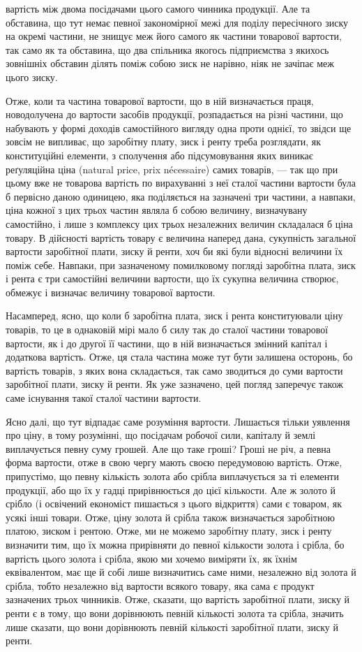 вартість між двома посідачами цього самого чинника продукції. Але та обставина,
що тут немає певної закономірної межі для поділу пересічного зиску
на окремі частини, не знищує меж його самого як частини товарової вартости,
так само як та обставина, що два спільника якогось підприємства з якихось
зовнішніх обставин ділять поміж собою зиск не нарівно, ніяк не зачіпає меж
цього зиску.

Отже, коли та частина товарової вартости, що в ній визначається праця,
новодолучена до вартости засобів продукції, розпадається на різні частини, що
набувають у формі доходів самостійного вигляду одна проти однієї, то звідси ще
зовсім не випливає, що заробітну плату, зиск і ренту треба розглядати, як
конституційні елементи, з сполучення або підсумовування яких виникає реґуляційна
ціна (natural price, prix nécessaire) самих товарів, — так що при цьому
вже не товарова вартість по вирахуванні з неї сталої частини вартости була б
первісно даною одиницею, яка поділяється на зазначені три частини, а навпаки,
ціна кожної з цих трьох частин являла б собою величину, визначувану самостійно,
і лише з комплексу цих трьох незалежних величин складалася б ціна
товару. В дійсності вартість товару є величина наперед дана, сукупність загальної
вартости заробітної плати, зиску й ренти, хоч би які були відносні величини їх
поміж себе. Навпаки, при зазначеному помилковому погляді заробітна плата,
зиск і рента є три самостійні величини вартости, що їх сукупна величина
створює, обмежує і визначає величину товарової вартости.

Насамперед, ясно, що коли б заробітна плата, зиск і рента конституювали
ціну товарів, то це в однаковій мірі мало б силу так до сталої частини товарової
вартости, як і до другої її частини, що в ній визначається змінний капітал
і додаткова вартість. Отже, ця стала частина може тут бути залишена
осторонь, бо вартість товарів, з яких вона складається, так само зводиться до
суми вартости заробітної плати, зиску й ренти. Як уже зазначено, цей погляд
заперечує також саме існування такої сталої частини вартости.

Ясно далі, що тут відпадає саме розуміння вартости. Лишається тільки
уявлення про ціну, в тому розумінні, що посідачам робочої сили, капіталу
й землі виплачується певну суму грошей. Але що таке гроші? Гроші не річ,
а певна форма вартости, отже в свою чергу мають своєю передумовою вартість.
Отже, припустімо, що певну кількість золота або срібла виплачується за ті елементи
продукції, або що їх у гадці прирівнюється до цієї кількости. Але ж
золото й срібло (і освічений економіст пишається з цього відкриття) сами є
товаром, як усякі інші товари. Отже, ціну золота й срібла також визначається
заробітною платою, зиском і рентою. Отже, ми не можемо заробітну плату, зиск
і ренту визначити тим, що їх можна прирівняти до певної кількости золота
і срібла, бо вартість цього золота і срібла, якою ми хочемо виміряти їх, як їхнім
еквівалентом, має ще й собі лише визначитись саме ними, незалежно від золота
й срібла, тобто незалежно від вартости всякого товару, яка сама є продукт зазначених
трьох чинників. Отже, сказати, що вартість заробітної плати, зиску
й ренти є в тому, що вони дорівнюють певній кількості золота та срібла, значить
лише сказати, що вони дорівнюють певній кількості заробітної плати,
зиску й ренти.

